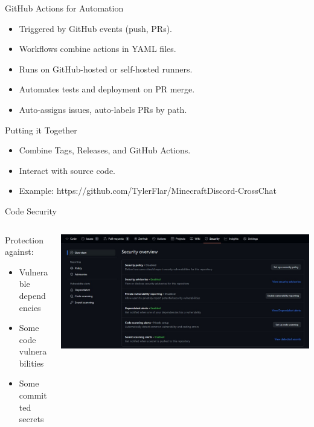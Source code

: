 \documentclass[aspectratio=169]{beamer}
\begin{document}
\begin{frame}{GitHub Actions for Automation}
    \begin{itemize}
        \item Triggered by GitHub events (push, PRs).
        \item Workflows combine actions in YAML files.
        \item Runs on GitHub-hosted or self-hosted runners.
        \item Automates tests and deployment on PR merge.
        \item Auto-assigns issues, auto-labels PRs by path.
    \end{itemize}
\end{frame}
\begin{frame}{Putting it Together}
    \begin{itemize}
        \item Combine Tags, Releases, and GitHub Actions.
        \item Interact with source code.
        \item Example: https://github.com/TylerFlar/MinecraftDiscord-CrossChat
    \end{itemize}
\end{frame}
\begin{frame}{Code Security}
    \begin{columns}
        \begin{column}{0.4\textwidth}
            Protection against:
            \begin{itemize}
                \item Vulnerable dependencies
                \item Some code vulnerabilities
                \item Some committed secrets
            \end{itemize}
        \end{column}
        \begin{column}{0.6\textwidth}
            \includegraphics[width=\textwidth,height=0.8\textheight,keepaspectratio]{github_security.jpg}
        \end{column}
    \end{columns}
\end{frame}
\end{document}
